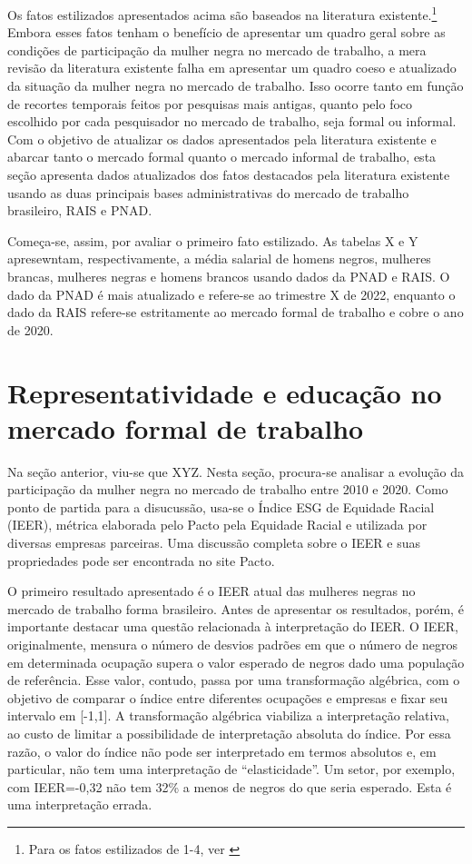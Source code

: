 \documentclass[12pt]{article}
\begin{document}
\par Os fatos estilizados apresentados acima são baseados na literatura existente.\footnote{Para os fatos estilizados de 1-4, ver \cite{soares2000perfil}} Embora esses fatos tenham o benefício de apresentar um quadro geral sobre as condições de participação da mulher negra no mercado de trabalho, a mera revisão da literatura existente falha em apresentar um quadro coeso e atualizado da situação da mulher negra no mercado de trabalho. Isso ocorre tanto em função de recortes temporais feitos por pesquisas mais antigas, quanto pelo foco escolhido por cada pesquisador no mercado de trabalho, seja formal ou informal. Com o objetivo de atualizar os dados apresentados pela literatura existente e abarcar tanto o mercado formal quanto o mercado informal de trabalho, esta seção apresenta dados atualizados dos fatos destacados pela literatura existente usando as duas principais bases administrativas do mercado de trabalho brasileiro, RAIS e PNAD.

\par Começa-se, assim, por avaliar o primeiro fato estilizado. As tabelas X e Y apresewntam, respectivamente, a média salarial de homens negros, mulheres brancas, mulheres negras e homens brancos usando dados da PNAD e RAIS. O dado da PNAD é mais atualizado e refere-se ao trimestre X de 2022, enquanto o dado da RAIS refere-se estritamente ao mercado formal de trabalho e cobre o ano de 2020.




\section{Representatividade e educação no mercado formal de trabalho} 

\par Na seção anterior, viu-se que XYZ. Nesta seção, procura-se analisar a evolução da participação da mulher negra no mercado de trabalho entre 2010 e 2020. Como ponto de partida para a disucussão, usa-se o Índice ESG de Equidade Racial (IEER), métrica elaborada pelo Pacto pela Equidade Racial e utilizada por diversas empresas parceiras. Uma discussão completa sobre o IEER e suas propriedades pode ser encontrada no site Pacto.

\par O primeiro resultado apresentado é o IEER atual das mulheres negras no mercado de trabalho forma brasileiro. Antes de apresentar os resultados, porém, é importante destacar uma questão relacionada à interpretação do IEER. O IEER, originalmente, mensura o número de desvios padrões em que o número de negros em determinada ocupação supera o valor esperado de negros dado uma população de referência. Esse valor, contudo, passa por uma transformação algébrica, com o objetivo de comparar o índice entre diferentes ocupações e empresas e fixar seu intervalo em [-1,1]. A transformação algébrica viabiliza a interpretação relativa, ao custo de limitar a possibilidade de interpretação absoluta do índice. Por essa razão, o valor do índice não pode ser interpretado em termos absolutos e, em particular, não tem uma interpretação de \enquote{elasticidade}. Um setor, por exemplo, com IEER=-0,32 não tem 32\% a menos de negros do que seria esperado. Esta é uma interpretação errada.
\end{document}
